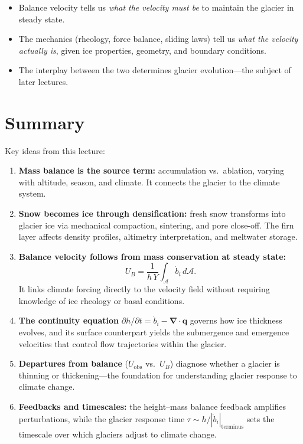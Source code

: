 \documentclass[11pt]{article}
\begin{document}
\begin{itemize}
  \item Balance velocity tells us \emph{what the velocity must be} to maintain the glacier in steady state.
  \item The mechanics (rheology, force balance, sliding laws) tell us \emph{what the velocity actually is}, given ice properties, geometry, and boundary conditions.
  \item The interplay between the two determines glacier evolution---the subject of later lectures.
\end{itemize}

\section{Summary}

Key ideas from this lecture:

\begin{enumerate}
  \item \textbf{Mass balance is the source term:} accumulation vs.\ ablation, varying with altitude, season, and climate.  It connects the glacier to the climate system.

  \item \textbf{Snow becomes ice through densification:} fresh snow transforms into glacier ice via mechanical compaction, sintering, and pore close-off.  The firn layer affects density profiles, altimetry interpretation, and meltwater storage.

  \item \textbf{Balance velocity follows from mass conservation at steady state:}
  \begin{equation}
    U_B = \frac{1}{h\,Y} \int_{\mathcal{A}} \dot{b}_i \, d\mathcal{A}.
  \end{equation}
  It links climate forcing directly to the velocity field without requiring knowledge of ice rheology or basal conditions.

  \item \textbf{The continuity equation} $\partial h/\partial t = \dot{b}_i - \bm{\nabla}\cdot\bm{q}$ governs how ice thickness evolves, and its surface counterpart yields the submergence and emergence velocities that control flow trajectories within the glacier.

  \item \textbf{Departures from balance} ($U_{\text{obs}}$ vs.\ $U_B$) diagnose whether a glacier is thinning or thickening---the foundation for understanding glacier response to climate change.

  \item \textbf{Feedbacks and timescales:} the height--mass balance feedback amplifies perturbations, while the glacier response time $\tau \sim h/|\dot{b}_i|_{\text{terminus}}$ sets the timescale over which glaciers adjust to climate change.
\end{enumerate}
\end{document}
